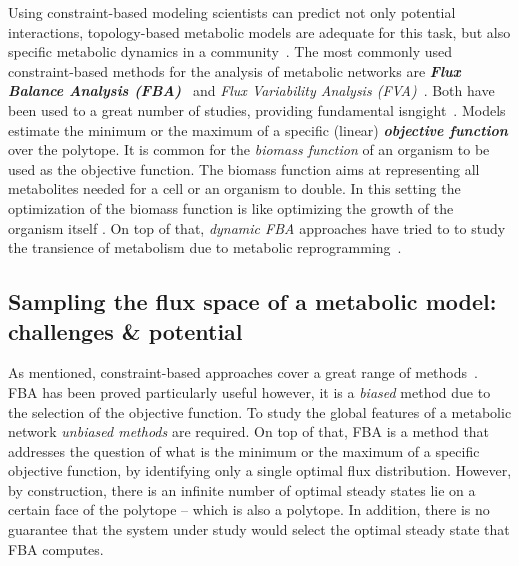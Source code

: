       Using constraint-based modeling scientists can 
      predict not only potential interactions,
      topology-based metabolic models are adequate for this task, 
      but also specific metabolic dynamics in a community~\citep{levy2012reverse}. 
      The most commonly used constraint-based methods for the analysis of metabolic networks
      are \textit{\textbf{Flux Balance Analysis (FBA)}}~\citep{orth2010flux} and 
      \textit{Flux Variability Analysis (FVA)}~\citep{gudmundsson2010computationally}.
      Both have been used to a great number of studies, providing fundamental isngight~\citep{ shastri2005flux,chapman2015flux}.
      Models estimate the minimum or the maximum of a specific (linear) \textit{\textbf{objective function}} over the polytope.
      It is common for the \textit{biomass function} of an
      organism to be used as the objective function.  
      The biomass function aims at representing all metabolites needed for a cell or an organism to double.
      In this setting the optimization of the biomass function is like optimizing the growth of the organism itself \citep{feist2010biomass}.
      On top of that, \textit{dynamic FBA} approaches
      have tried to to study the transience of metabolism 
      due to metabolic reprogramming~\citep{mahadevan2002dynamic}.


   \subsection{Sampling the flux space of a metabolic model: challenges \& potential}

      As mentioned, constraint-based approaches cover a great range of methods~\citep{lewis2012constraining}.
      FBA has been proved particularly useful
      however, 
      it is a \textit{biased} method due to the selection
      of the objective function. 
      To study the global features of a metabolic network
      \textit{unbiased methods} are required. 
      On top of that, FBA is a method that addresses the question 
      of what is the minimum or the maximum of a
      specific objective function,
      by identifying only a single optimal flux distribution.
      However, by construction, there is an infinite number of optimal steady states lie on a certain face of the polytope -- which is also a polytope. 
      In addition, there is no guarantee that the system under study would select 
      the optimal steady state that FBA computes.
      


